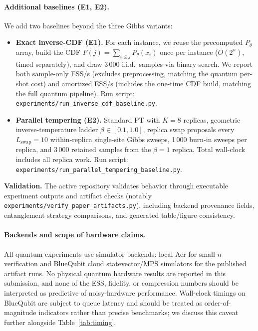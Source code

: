 \documentclass[conference,10pt]{IEEEtran}
\begin{document}
\paragraph{Additional baselines (E1, E2).} We add two baselines beyond the three Gibbs variants:
\begin{itemize}[leftmargin=*, topsep=0pt, itemsep=1pt]
  \item \textbf{Exact inverse-CDF (E1).} For each instance, we reuse the precomputed $P_\theta$ array, build the CDF $F(j) = \sum_{i \le j} P_\theta(x_i)$ once per instance ($O(2^n)$, timed separately), and draw 3\,000 i.i.d.\ samples via binary search. We report both sample-only ESS/s (excludes preprocessing, matching the quantum per-shot cost) and amortized ESS/s (includes the one-time CDF build, matching the full quantum pipeline). Run script: \texttt{experiments/run\_inverse\_cdf\_baseline.py}.
  \item \textbf{Parallel tempering (E2).} Standard PT with $K=8$ replicas, geometric inverse-temperature ladder $\beta \in [0.1, 1.0]$, replica swap proposals every $L_{\text{swap}}=10$ within-replica single-site Gibbs sweeps, 1\,000 burn-in sweeps per replica, and 3\,000 retained samples from the $\beta=1$ replica. Total wall-clock includes all replica work. Run script: \texttt{experiments/run\_parallel\_tempering\_baseline.py}.
\end{itemize}

\textbf{Validation.} The active repository validates behavior through executable experiment outputs and artifact checks (notably \texttt{experiments/verify\_paper\_artifacts.py}), including backend provenance fields, entanglement strategy comparisons, and generated table/figure consistency.

\paragraph{Backends and scope of hardware claims.} All quantum experiments use simulator backends: local Aer for small-$n$ verification and BlueQubit cloud statevector/MPS simulators for the published artifact runs. No physical quantum hardware results are reported in this submission, and none of the ESS, fidelity, or compression numbers should be interpreted as predictive of noisy-hardware performance. Wall-clock timings on BlueQubit are subject to queue latency and should be treated as order-of-magnitude indicators rather than precise benchmarks; we discuss this caveat further alongside Table~\ref{tab:timing}.
\end{document}
